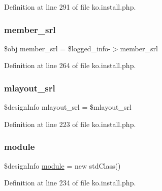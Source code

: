 Definition at line 291 of file ko.\+install.\+php.

\hypertarget{ko_8install_8php_aa61f9e08f0fe505094d26f8143f30bbd}{}\label{ko_8install_8php_aa61f9e08f0fe505094d26f8143f30bbd} 
\subsubsection{\texorpdfstring{member\+\_\+srl}{member\_srl}}
{\footnotesize\ttfamily \$obj member\+\_\+srl = \$logged\+\_\+info-\/$>$member\+\_\+srl}



Definition at line 264 of file ko.\+install.\+php.

\hypertarget{ko_8install_8php_a9cf497537007b08c645bed35f564be54}{}\label{ko_8install_8php_a9cf497537007b08c645bed35f564be54} 
\subsubsection{\texorpdfstring{mlayout\+\_\+srl}{mlayout\_srl}}
{\footnotesize\ttfamily \$design\+Info mlayout\+\_\+srl = \$mlayout\+\_\+srl}



Definition at line 223 of file ko.\+install.\+php.

\hypertarget{ko_8install_8php_a5c3fc1968f94c2b6a7c60845f284de78}{}\label{ko_8install_8php_a5c3fc1968f94c2b6a7c60845f284de78} 
\subsubsection{\texorpdfstring{module}{module}}
{\footnotesize\ttfamily \$design\+Info \hyperlink{classmodule}{module} = new std\+Class()}



Definition at line 234 of file ko.\+install.\+php.

\hypertarget{ko_8install_8php_a370bb6450fab1da3e0ed9f484a38b761}{}\label{ko_8install_8php_a370bb6450fab1da3e0ed9f484a38b761} 
